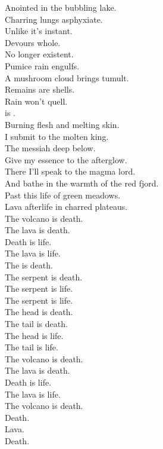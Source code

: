 Anointed in the bubbling lake. \\
Charring lungs asphyxiate. \\
Unlike  it's instant. \\
Devours whole. \\
No longer existent. \\
Pumice rain engulfs. \\
A mushroom cloud brings tumult. \\
Remains are shells. \\
Rain won't quell. \\
 is . \\

Burning flesh and melting skin. \\
I submit to the molten king. \\
The messiah deep below. \\
Give my essence to the afterglow. \\
There I'll speak to the magma lord. \\
And bathe in the warmth of the red fjord. \\
Past this life of green meadows. \\
Lava afterlife in charred plateaus. \\

The volcano is death. \\
The lava is death. \\
Death is life. \\
The lava is life. \\

The  is death. \\
The serpent is death. \\
The serpent is life. \\
The serpent is life. \\

The head is death. \\
The tail is death. \\
The head is life. \\
The tail is life. \\

The volcano is death. \\
The lava is death. \\
Death is life. \\
The lava is life. \\

The volcano is death. \\
Death. \\
Lava. \\
Death. \\

